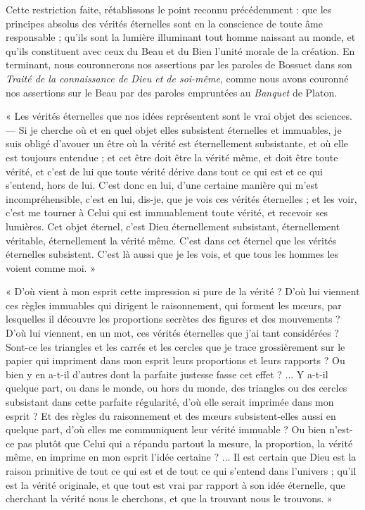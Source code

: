 \documentclass[a4paper, 11pt, oneside, landscape]{article}
\begin{document}
Cette restriction faite, rétablissons le point reconnu précédemment : que les principes absolus des vérités éternelles sont en la conscience de toute âme responsable ; qu'ils sont la lumière illuminant tout homme naissant au monde, et qu'ils constituent avec ceux du Beau et du Bien l'unité morale de la création. En terminant, nous couronnerons nos assertions par les paroles de Bossuet dans son \emph{Traité de la connaissance de Dieu et de soi-même}, comme nous avons couronné nos assertions sur le Beau par des paroles empruntées au \emph{Banquet} de Platon.

« Les vérités éternelles que nos idées représentent sont le vrai objet des sciences. --- Si je cherche où et en quel objet elles subsistent éternelles et immuables, je suis obligé d'avouer un être où la vérité est éternellement subsistante, et où elle est toujours entendue ; et cet être doit être la vérité même, et doit être toute vérité, et c'est de lui que toute vérité dérive dans tout ce qui est et ce qui s'entend, hors de lui. C'est donc en lui, d'une certaine manière qui m'est incompréhensible, c'est en lui, dis-je, que je vois ces vérités éternelles ; et les voir, c'est me tourner à Celui qui est immuablement toute vérité, et recevoir ses lumières. Cet objet éternel, c'est Dieu éternellement subsistant, éternellement véritable, éternellement la vérité même. C'est dans cet éternel que les vérités éternelles subsistent. C'est là aussi que je les vois, et que tous les hommes les voient comme moi. »

« D'où vient à mon esprit cette impression si pure de la vérité ? D'où lui viennent ces règles immuables qui dirigent le raisonnement, qui forment les mœurs, par lesquelles il découvre les proportions secrètes des figures et des mouvements ? D'où lui viennent, en un mot, ces vérités éternelles que j'ai tant considérées ? Sont-ce les triangles et les carrés et les cercles que je trace grossièrement sur le papier qui impriment dans mon esprit leurs proportions et leurs rapports ? Ou bien y en a-t-il d'autres dont la parfaite justesse fasse cet effet ? ... Y a-t-il quelque part, ou dans le monde, ou hors du monde, des triangles ou des cercles subsistant dans cette parfaite régularité, d'où elle serait imprimée dans mon esprit ? Et des règles du raisonnement et des mœurs subsistent-elles aussi en quelque part, d'où elles me communiquent leur vérité immuable ? Ou bien n'est-ce pas plutôt que Celui qui a répandu partout la mesure, la proportion, la vérité même, en imprime en mon esprit l'idée certaine ? ... Il est certain que Dieu est la raison primitive de tout ce qui est et de tout ce qui s'entend dans l'univers ; qu'il est la vérité originale, et que tout est vrai par rapport à son idée éternelle, que cherchant la vérité nous le cherchons, et que la trouvant nous le trouvons. »
\end{document}
